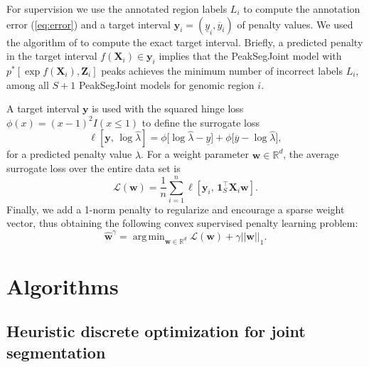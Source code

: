 \documentclass{article} %
\DeclareMathOperator*{\argmin}{arg\,min}
\newcommand{\RR}{\mathbb R}
\begin{document}
For supervision we use the annotated region labels $L_i$ to compute
the annotation error (\ref{eq:error}) and a target interval $\mathbf
y_i = (
    \underline y_i, \overline y_i
)$ of penalty values. We used the algorithm of
\citet{HOCKING-penalties} to compute the exact target interval.
Briefly,
a predicted penalty in the target interval $f(\mathbf
X_i)\in\mathbf y_i$ implies that the
PeakSegJoint model with $p^*\left[\exp f(\mathbf X_i), \mathbf
  Z_i\right]$ peaks achieves the minimum number of incorrect labels
$L_i$, among all $S+1$ PeakSegJoint models for genomic region $i$.

A target interval $\mathbf y$ is used with the squared hinge loss
$\phi(x)=(x-1)^2 I(x\leq 1)$ to define the surrogate loss
\begin{equation}
  \label{eq:surrogate_loss}
  \ell\left[
    \mathbf y,\,
    \log \hat \lambda
    \right]
    =
    \phi\big[
      \log\hat\lambda - \underline y
    \big]
    +
    \phi\big[
    \overline y - \log\hat\lambda
    \big],
\end{equation}
for a predicted penalty value $\hat \lambda$. For a weight parameter
$\mathbf w\in\RR^d$, the average surrogate loss over the entire data
set is
\begin{equation}
  \label{eq:average_surrogate}
  \mathcal L(\mathbf w) =
  \frac 1 n
  \sum_{i=1}^n
  \ell\left[
    \mathbf y_i,\,
    \mathbf 1_S^\intercal \mathbf X_i \mathbf w
    \right].
\end{equation}
Finally, we add a 1-norm penalty to regularize and encourage a sparse
weight vector, thus obtaining the following convex supervised penalty
learning problem:
\begin{equation}
  \label{argmin_w}
  \mathbf{\hat w}^\gamma = 
  \argmin_{\mathbf w\in\RR^d}
  \mathcal L(\mathbf w) + \gamma ||\mathbf w||_1.
\end{equation}

\section{Algorithms}

\subsection{Heuristic discrete optimization for joint segmentation}
\end{document}
